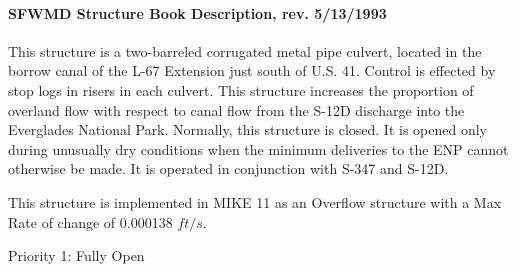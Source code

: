 \paragraph{SFWMD Structure Book Description, rev. 5/13/1993}
This structure is a two-barreled corrugated metal pipe culvert, located in the borrow canal of the L-67 Extension just south of U.S. 41. Control is effected by stop logs in risers in each culvert.
This structure increases the proportion of overland flow with respect to canal flow from the S-12D discharge into the Everglades National Park.
Normally, this structure is closed. It is opened only during unusually dry conditions when the minimum deliveries to the ENP cannot otherwise be made. It is operated in conjunction with S-347 and S-12D.

This structure is implemented in MIKE 11 as an Overflow structure with a Max Rate of change of 0.000138 $ft/s$.



\begin{packed_items}
\item Priority 1: Fully Open
\end{packed_items}

%
%
%


